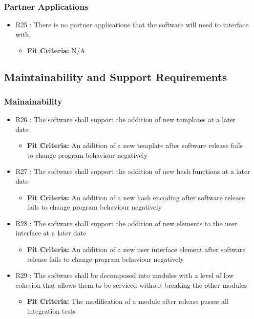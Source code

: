 \documentclass[12pt, titlepage]{article}
\begin{document}
\subsubsection{Partner Applications}
\begin{itemize}
\item{R25 : There is no partner applications that the software will need to interface with.}
\begin{itemize}
\item{\textbf{Fit Criteria:} N/A}
\end{itemize}
\end{itemize}
\subsection{Maintainability and Support Requirements}
\subsubsection{Mainainability}
\begin{itemize}
\item{R26 : The software shall support the addition of new templates at a later date}
\begin{itemize}
\item{\textbf{Fit Criteria:} An addition of a new template after software release fails to change program behaviour negatively}
\end{itemize}
\item{R27 : The software shall support the addition of new hash functions at a later date}
\begin{itemize}
\item{\textbf{Fit Criteria:} An addition of a new hash encoding after software release fails to change program behaviour negatively}
\end{itemize}
\item{R28 : The software shall support the addition of new elements to the user interface at a later date}
\begin{itemize}
\item{\textbf{Fit Criteria:} An addition of a new user interface element after software release fails to change program behaviour negatively}
\end{itemize}
\item{R29 : The software shall be decomposed into modules with a level of low cohesion that allows them to be serviced without breaking the other modules}
\begin{itemize}
\item{\textbf{Fit Criteria:} The modification of a module after release passes all integration tests}
\end{itemize}
\end{itemize}
\end{document}
